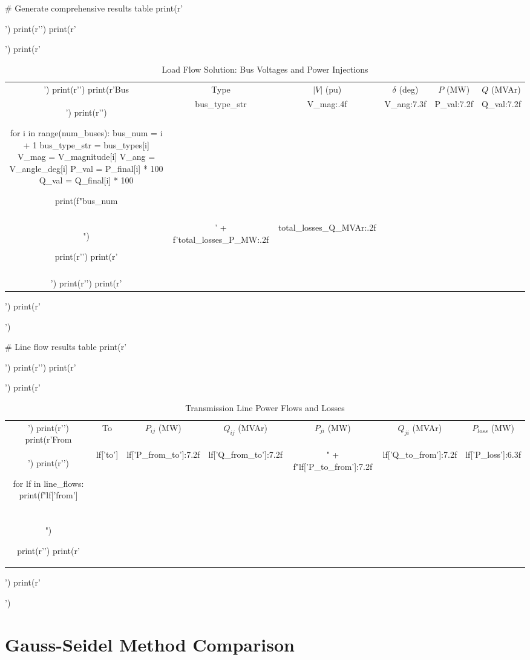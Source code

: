 \documentclass[11pt,a4paper]{article}
\begin{document}
\begin{pycode}
# Generate comprehensive results table
print(r'\begin{table}[H]')
print(r'\centering')
print(r'\caption{Load Flow Solution: Bus Voltages and Power Injections}')
print(r'\begin{tabular}{@{}cccccc@{}}')
print(r'\toprule')
print(r'Bus & Type & $|V|$ (pu) & $\delta$ (deg) & $P$ (MW) & $Q$ (MVAr) \\')
print(r'\midrule')

for i in range(num_buses):
    bus_num = i + 1
    bus_type_str = bus_types[i]
    V_mag = V_magnitude[i]
    V_ang = V_angle_deg[i]
    P_val = P_final[i] * 100
    Q_val = Q_final[i] * 100

    print(f"{bus_num} & {bus_type_str} & {V_mag:.4f} & {V_ang:7.3f} & {P_val:7.2f} & {Q_val:7.2f} \\\\")

print(r'\midrule')
print(r'\multicolumn{4}{l}{Total System Losses:} & ' +
      f'{total_losses_P_MW:.2f} & {total_losses_Q_MVAr:.2f} \\\\')
print(r'\bottomrule')
print(r'\end{tabular}')
print(r'\end{table}')

# Line flow results table
print(r'\begin{table}[H]')
print(r'\centering')
print(r'\caption{Transmission Line Power Flows and Losses}')
print(r'\begin{tabular}{@{}ccccccc@{}}')
print(r'\toprule')
print(r'From & To & $P_{ij}$ (MW) & $Q_{ij}$ (MVAr) & $P_{ji}$ (MW) & $Q_{ji}$ (MVAr) & $P_{loss}$ (MW) \\')
print(r'\midrule')

for lf in line_flows:
    print(f"{lf['from']} & {lf['to']} & {lf['P_from_to']:7.2f} & {lf['Q_from_to']:7.2f} & " +
          f"{lf['P_to_from']:7.2f} & {lf['Q_to_from']:7.2f} & {lf['P_loss']:6.3f} \\\\")

print(r'\bottomrule')
print(r'\end{tabular}')
print(r'\end{table}')
\end{pycode}

\section{Gauss-Seidel Method Comparison}
\end{document}

